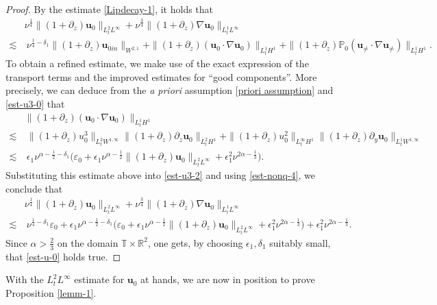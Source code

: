 \documentclass[11pt,reqno]{article}
\numberwithin{equation}{section}
\newcommand\R{{\mathbb R}}
\newcommand\T{{\mathbb T}}
\newcommand\PP{{\mathbb P}}
\newcommand\uu{\bm{u}}
\let\pa=\partial
\let\al=\alpha
\let\var=\varepsilon
\let\f=\frac
\let\ep=\epsilon
\begin{document}
\begin{proof}
By the estimate \eqref{Lipdecay-1}, it holds that
\begin{align}\label{est-u3-2}
	&\nu^{\f14}\|(1+\pa_z)\uu_0\|_{L^2_tL^\infty}
	+\nu^{\f34}\|(1+\pa_z)\nabla\uu_0\|_{L^1_tL^\infty}
    \nonumber
    \\
	\lesssim&~ \nu^{\f{1}{4}-\delta_1}\|(1+\pa_z)\uu_{0in}\|_{W^{2,1}}
    +\|(1+\pa_z)(\uu_0\cdot\nabla\uu_0)\|_{L^1_tH^{1}}
    +\|(1+\pa_z)\PP_0(\uu_{\not=}\cdot\nabla\uu_{\not=})\|_{L^1_tH^{1}}.
\end{align}
To obtain a refined estimate, we make use 
of the exact expression of the transport terms and the improved estimates for 
``good components''.
More precisely, we can deduce from the \textit{a priori} assumption \eqref{priori assumption} and \eqref{est-u3-0} that
\begin{align*}
    &\|(1+\pa_z)(\uu_0\cdot\nabla\uu_0)\|_{L^1_tH^{1}}
    \nonumber
    \\
    \lesssim 
    &~
    \|(1+\pa_z)u^3_0\|_{L^2_tW^{1,\infty}}
    \|(1+\pa_z)\pa_z \uu_0\|_{L^2_tH^{1}}
      +\|(1+\pa_z)u^2_0\|_{L^\infty_tH^{1}}
    \|(1+\pa_z)\pa_y \uu_0\|_{L^1_tW^{1,\infty}}
    \nonumber
    \\
    \lesssim
    &~
    \ep_1\nu^{\al-\f12-\delta_1}\big(\var_0+\ep_1\nu^{\alpha-\f12} \|(1+\pa_z)\uu_0\|_{L^2_tL^{\infty}}+\ep_1^2\nu^{2\al-\f13}\big).
\end{align*}
Substituting this estimate above into \eqref{est-u3-2} and using \eqref{est-nonq-4}, we conclude that
\begin{align*}
    &\nu^{\f14}\|(1+\pa_z)\uu_0\|_{L^2_tL^\infty}
	+\nu^{\f34}\|(1+\pa_z)\nabla\uu_0\|_{L^1_tL^\infty}
    \nonumber
    \\
	\lesssim&~ \nu^{\f{1}{4}-\delta_1}\var_0
    +\ep_1\nu^{\al-\f12-\delta_1}\big(\var_0+\ep_1\nu^{\alpha-\f12} \|(1+\pa_z)\uu_0\|_{L^2_tL^{\infty}}+\ep_1^2\nu^{2\al-\f13}\big)
    +\ep_1^2 \nu^{2\al-\f13}.
\end{align*}
Since $\al>\f23$ on the domain $\T\times\R^2$, one gets, by choosing $\ep_1,\delta_1$ suitably small, that \eqref{est-u-0} holds true.

\end{proof}


With the $L^2_tL^{\infty}$ estimate for $\uu_0$ at hands, we are now in position to prove Proposition \ref{lemm-1}.
\end{document}
